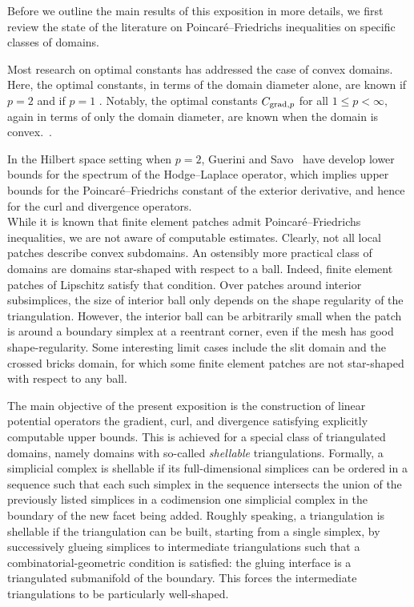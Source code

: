 \documentclass[a4paper]{article}
\begin{document}
Before we outline the main results of this exposition in more details, 
we first review the state of the literature on Poincar\'e--Friedrichs inequalities on specific classes of domains. 








Most research on optimal constants has addressed the case of convex domains. 
Here, the optimal constants, in terms of the domain diameter alone, are known if $p=2$ \cite{bebendorf2003note} and if $p=1$ \cite{acosta2004optimal}. 
Notably, the optimal constants $C_{\operatorname{grad},p}$ for all $1 \leq p < \infty$, again in terms of only the domain diameter, are known when the domain is convex.~\cite{esposito2013poincare,ferone2012remark}.

In the Hilbert space setting when $p = 2$, Guerini and Savo~\cite{guerini2004eigenvalue} have develop lower bounds for the spectrum of the Hodge--Laplace operator, which implies upper bounds for the Poincar\'e--Friedrichs constant of the exterior derivative, and hence for the curl and divergence operators.
\\

While it is known that finite element patches admit Poincar\'e--Friedrichs inequalities, 
we are not aware of computable estimates. 
Clearly, not all local patches describe convex subdomains. 
An ostensibly more practical class of domains are domains star-shaped with respect to a ball.
Indeed, finite element patches of Lipschitz satisfy that condition. 
Over patches around interior subsimplices, the size of interior ball only depends on the shape regularity of the triangulation. However, the interior ball can be arbitrarily small when the patch is around a boundary simplex at a reentrant corner, even if the mesh has good shape-regularity. 
Some interesting limit cases include the slit domain and the crossed bricks domain,
for which some finite element patches are not star-shaped with respect to any ball. 




The main objective of the present exposition is the construction of linear potential operators the gradient, curl, and divergence satisfying explicitly computable upper bounds. This is achieved for a special class of triangulated domains,
namely domains with so-called \emph{shellable} triangulations. 
Formally, a simplicial complex is shellable if its full-dimensional simplices can be ordered in a sequence such that each such simplex in the sequence intersects the union of the previously listed simplices in a codimension one simplicial complex in the boundary of the new facet being added. 
Roughly speaking, a triangulation is shellable if the triangulation can be built, starting from a single simplex,
by successively glueing simplices to intermediate triangulations such that a combinatorial-geometric condition is satisfied:
the gluing interface is a triangulated submanifold of the boundary. 
This forces the intermediate triangulations to be particularly well-shaped. 
\end{document}
